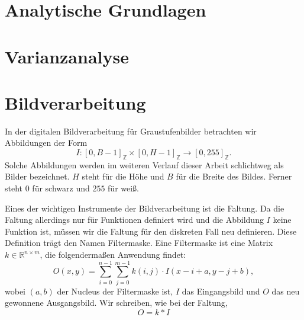 \documentclass[a4paper, 11pt]{report}
\theoremstyle{definition}
\begin{document}
	\section{Analytische Grundlagen}

	\section{Varianzanalyse}
	\section{Bildverarbeitung}\label{sec:imageproc}
		In der digitalen Bildverarbeitung für Graustufenbilder betrachten wir Abbildungen der Form
		$$ I: [0, B-1]_\mathbb{Z} \times [0, H-1]_\mathbb{Z} \to [0,255]_\mathbb{Z}. $$
		Solche Abbildungen werden im weiteren Verlauf dieser Arbeit schlichtweg als Bilder bezeichnet. $H$ steht für die Höhe und $B$ für die Breite des Bildes. Ferner steht $0$ für schwarz und $255$ für weiß.
		
		Eines der wichtigen Instrumente der Bildverarbeitung ist die Faltung. Da die Faltung allerdings nur für Funktionen definiert wird und die Abbildung $I$ keine Funktion ist, müssen wir die Faltung für den diskreten Fall neu definieren. Diese Definition trägt den Namen Filtermaske.
		Eine Filtermaske ist eine Matrix $k \in \mathbb{R}^{n \times m}$, die folgendermaßen Anwendung findet:
		$$ O(x,y) = \sum_{i=0}^{n-1} \sum_{j=0}^{m-1} k(i,j) \cdot I(x-i+a, y-j+b),$$
		wobei $(a,b)$ der Nucleus der Filtermaske ist, $I$ das Eingangsbild und $O$ das neu gewonnene Ausgangsbild.
		Wir schreiben, wie bei der Faltung,
		$$ O = k * I $$
\end{document}
